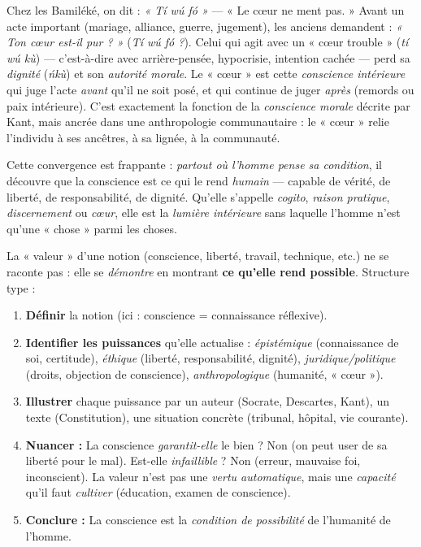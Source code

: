 \documentclass[11pt]{article}
\begin{document}
\begin{exemplebox}
Chez les Bamiléké, on dit : \emph{« Tí wú fó »} — « Le cœur ne ment pas. » Avant un acte important (mariage, alliance, guerre, jugement), les anciens demandent : \emph{« Ton cœur est-il pur ? »} (\emph{Tí wú fó ?}). Celui qui agit avec un « cœur trouble » (\emph{tí wú kù}) — c'est-à-dire avec arrière-pensée, hypocrisie, intention cachée — perd sa \emph{dignité} (\emph{ńkù}) et son \emph{autorité morale}. Le « cœur » est cette \emph{conscience intérieure} qui juge l'acte \emph{avant} qu'il ne soit posé, et qui continue de juger \emph{après} (remords ou paix intérieure). C'est exactement la fonction de la \emph{conscience morale} décrite par Kant, mais ancrée dans une anthropologie communautaire : le « cœur » relie l'individu à ses ancêtres, à sa lignée, à la communauté.
\end{exemplebox}

Cette convergence est frappante : \emph{partout où l'homme pense sa condition}, il découvre que la conscience est ce qui le rend \emph{humain} — capable de vérité, de liberté, de responsabilité, de dignité. Qu'elle s'appelle \emph{cogito}, \emph{raison pratique}, \emph{discernement} ou \emph{cœur}, elle est la \emph{lumière intérieure} sans laquelle l'homme n'est qu'une « chose » parmi les choses.

\begin{methode}
La « valeur » d'une notion (conscience, liberté, travail, technique, etc.) ne se raconte pas : elle se \emph{démontre} en montrant \textbf{ce qu'elle rend possible}. Structure type :
\begin{enumerate}
\item \textbf{Définir} la notion (ici : conscience = connaissance réflexive).
\item \textbf{Identifier les puissances} qu'elle actualise : \emph{épistémique} (connaissance de soi, certitude), \emph{éthique} (liberté, responsabilité, dignité), \emph{juridique/politique} (droits, objection de conscience), \emph{anthropologique} (humanité, « cœur »).
\item \textbf{Illustrer} chaque puissance par un auteur (Socrate, Descartes, Kant), un texte (Constitution), une situation concrète (tribunal, hôpital, vie courante).
\item \textbf{Nuancer :} La conscience \emph{garantit-elle} le bien ? Non (on peut user de sa liberté pour le mal). Est-elle \emph{infaillible} ? Non (erreur, mauvaise foi, inconscient). La valeur n'est pas une \emph{vertu automatique}, mais une \emph{capacité} qu'il faut \emph{cultiver} (éducation, examen de conscience).
\item \textbf{Conclure :} La conscience est la \emph{condition de possibilité} de l'humanité de l'homme.
\end{enumerate}
\end{methode}
\end{document}
